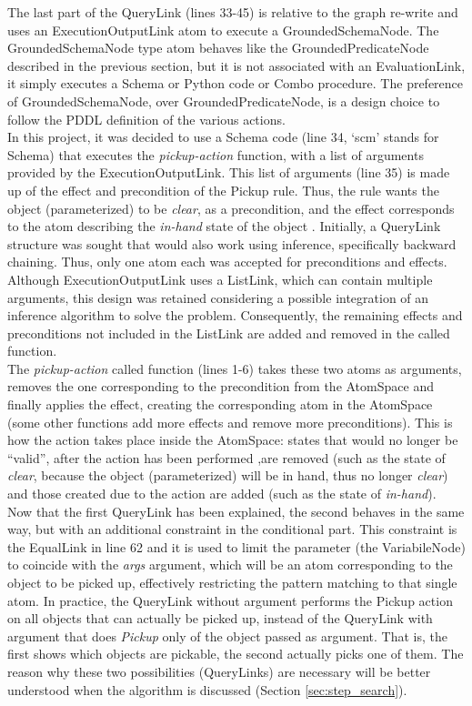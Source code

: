 The last part of the QueryLink (lines 33-45) is relative to the graph re-write and uses an ExecutionOutputLink atom to execute a GroundedSchemaNode. The GroundedSchemaNode type atom behaves like the GroundedPredicateNode described in the previous section, but it is not associated with an EvaluationLink, it simply executes a Schema or Python code or Combo procedure. The preference of GroundedSchemaNode, over GroundedPredicateNode, is a design choice to follow the PDDL definition of the various actions. \\
In this project, it was decided to use a Schema code (line 34, `scm' stands for Schema) that executes the \textit{pickup-action} function, with a list of arguments provided by the ExecutionOutputLink. 
This list of arguments (line 35) is made up of the effect and precondition of the Pickup rule. Thus, the rule wants the object (parameterized) to be \textit{clear}, as a precondition, and the effect corresponds to the atom describing the \textit{in-hand} state of the object . 
Initially, a QueryLink structure was sought that would also work using inference, specifically backward chaining. Thus, only one atom each was accepted for preconditions and effects. Although ExecutionOutputLink uses a ListLink, which can contain multiple arguments, this design was retained considering a possible integration of an inference algorithm to solve the problem. Consequently, the remaining effects and preconditions not included in the ListLink are added and removed in the called function. \\
The \textit{pickup-action} called function (lines 1-6) takes these two atoms as arguments, removes the one corresponding to the precondition from the AtomSpace and finally applies the effect, creating the corresponding atom in the AtomSpace (some other functions add more effects and remove more preconditions). This is how the action takes place inside the AtomSpace: states that would no longer be \enquote{valid}, after the action has been performed ,are removed (such as the state of \textit{clear}, because the object (parameterized) will be in hand, thus no longer \textit{clear}) and those created due to the action are added (such as the state of \textit{in-hand}). \\

Now that the first QueryLink has been explained, the second behaves in the same way, but with an additional constraint in the conditional part. 
This constraint is the EqualLink in line 62 and it is used to limit the parameter (the VariabileNode) to coincide with the \textit{args} argument, which will be an atom corresponding to the object to be picked up, effectively restricting the pattern matching to that single atom. 
In practice, the QueryLink without argument performs the Pickup action on all objects that can actually be picked up, instead of the QueryLink with argument that does \textit{Pickup} only of the object passed as argument. That is, the first shows which objects are pickable, the second actually picks one of them. 
The reason why these two possibilities (QueryLinks) are necessary will be better understood when the algorithm is discussed (Section \ref{sec:step_search}). 

 